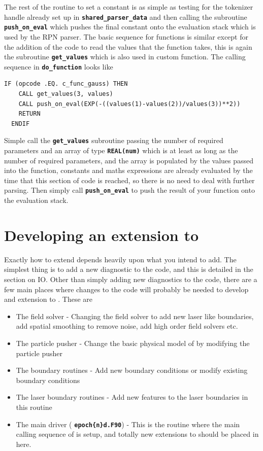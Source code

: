 \documentclass[12pt,a4paper]{article}
\newcommand{\simpleboxverbatim}{\begin{Verbatim}[obeytabs=true,frame=single,
  framerule=0.5mm,rulecolor=\color{warwickmid},formatcom=\color{black}]}
\newcommand{\inlinecode}[1]{{\color{warwickred} \bf\texttt{#1}}}
\newcommand{\EPOCH}{{\color{warwickdark}\fontfamily{phv}\selectfont{EPOCH}}}
\begin{document}
The rest of the routine to set a constant is as simple as testing for the
tokenizer handle already set up in \inlinecode{shared\_parser\_data} and then
calling the subroutine \inlinecode{push\_on\_eval} which pushes the final constant
onto the evaluation stack which is used by the RPN parser. The basic sequence
for functions is similar except for the addition of the code to read the values
that the function takes, this is again the subroutine \inlinecode{get\_values}
which is also used in custom function. The calling sequence in
\inlinecode{do\_function} looks like

\simpleboxverbatim
  IF (opcode .EQ. c_func_gauss) THEN
    CALL get_values(3, values)
    CALL push_on_eval(EXP(-((values(1)-values(2))/values(3))**2))
    RETURN
  ENDIF
\end{Verbatim}
Simple call the \inlinecode{get\_values} subroutine passing the number of
required parameters and an array of type \inlinecode{REAL(num)} which is at
least as long as the number of required parameters, and the array is populated
by the values passed into the function, constants and maths expressions are
already evaluated by the time that this section of code is reached, so there is
no need to deal with further parsing. Then simply call \inlinecode{push\_on\_eval}
to push the result of your function onto the evaluation stack.

\section{Developing an extension to {\EPOCH}}

Exactly how to extend {\EPOCH} depends heavily upon what you intend to add. The
simplest thing is to add a new diagnostic to the code, and this is detailed in
the section on {\EPOCH} IO. Other than simply adding new diagnostics to the code,
there are a few main places where changes to the code will probably be needed
to develop and extension to \EPOCH. These are
\begin{itemize}
\item The field solver - Changing the field solver to add new laser like
  boundaries, add spatial smoothing to remove noise, add high order field
  solvers etc.
\item The particle pusher - Change the basic physical model of {\EPOCH} by
  modifying the particle pusher
\item The boundary routines - Add new boundary conditions or modify existing
  boundary conditions
\item The laser boundary routines - Add new features to the laser boundaries in
  this routine
\item The main driver (\inlinecode{epoch\{n\}d.F90}) - This is the routine
  where the main calling sequence of {\EPOCH} is setup, and totally new
  extensions to {\EPOCH} should be placed in here.
\end{itemize}
\end{document}
